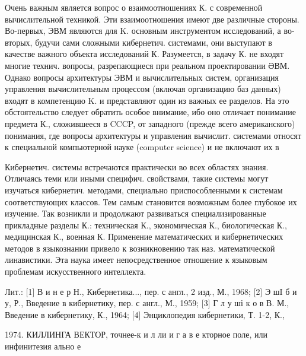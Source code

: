 \documentclass[10pt]{article}
\begin{document}
Очень важным является вопрос о взаимоотношениях К. с современной вычислительной техникой. Эти взаимоотношения имеют две различные стороны. Во-первых, ЭВМ являются для $\mathrm{K}$. основным инструментом исследований, а во-вторых, будучи сами сложными кибернетич. системами, они выступают в качестве важного объекта исследований $К$. Разумеется, в задачу К. не входят многие технич. вопросы, разрепающиеся при реальном проектировании ӘВМ. Однако вопросы архитектуры ЭВМ и вычислительных систем, организация управления вычислительным процессом (включая организацию баз данных) входят в компетенцию $\mathrm{K}$. и представляют один из важных ее разделов. На это обстоятельство следует обратить особое внимание, ибо оно отличает понимание предмета К., сложившееся в CCCP, от западного (прежде всего американского) понимания, где вопросы архитектуры и управления вычислит. системами относят к специальной компьютерной науке (computer science) и не включают их в



Кибернетич. системы встречаются практически во всех областях знания. Отличаясь теми или иными специфич. свойствами, такие системы могут изучаться кибернетич. методами, специально приспособленными к системам соответствующих классов. Тем самым становится возможным более глубокое их изучение. Так возникли и продолжают развиваться специализированные прикладные разделы К.: техническая К., экономическая К., биологическая К., медицинская К., военная К. Применение математических и кибернетических методов в языкознании привело к возникновению так наз. математической линавистики. Эта наука имеет непосредственное отношение к языковым проблемам искусственного интеллекта.



Лит.: [1] В и н е р Н., Кибернетика..., пер. с англ., 2 изд., М., 1968; [2] Э шI б и у, Р., Введение в кибернетику, пер. с англ., М., 1959; [3] Г л у ші к о в В. М., Введение в кибернетику, К., 1964; [4] Энциклопедия кибернетики, Т. 1-2, К.,

1974. КИЛЛИНГА ВЕКТОР, точнее-к и л ли и г а в е кторное поле, или инфинитезия ально е
\end{document}
